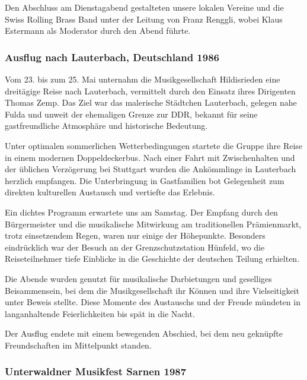 \begin{history}

    Den Abschluss am Dienstagabend gestalteten unsere lokalen Vereine und die
    Swiss Rolling Brass Band unter der Leitung von Franz Renggli, wobei Klaus
    Estermann als Moderator durch den Abend führte.

    \subsubsection*{Ausflug nach Lauterbach, Deutschland 1986}

    Vom 23. bis zum 25. Mai unternahm die Musikgesellschaft Hildisrieden eine
    dreitägige Reise nach Lauterbach, vermittelt durch den Einsatz ihres
    Dirigenten Thomas Zemp. Das Ziel war das malerische Städtchen Lauterbach,
    gelegen nahe Fulda und unweit der ehemaligen Grenze zur DDR, bekannt für
    seine gastfreundliche Atmosphäre und historische Bedeutung.

    Unter optimalen sommerlichen Wetterbedingungen startete die Gruppe ihre
    Reise in einem modernen Doppeldeckerbus. Nach einer Fahrt mit Zwischenhalten
    und der üblichen Verzögerung bei Stuttgart wurden die Ankömmlinge in
    Lauterbach herzlich empfangen. Die Unterbringung in Gastfamilien bot
    Gelegenheit zum direkten kulturellen Austausch und vertiefte das Erlebnis.

    Ein dichtes Programm erwartete uns am Samstag. Der Empfang durch den
    Bürgermeister und die musikalische Mitwirkung am traditionellen
    Prämienmarkt, trotz einsetzendem Regen, waren nur einige der Höhepunkte.
    Besonders eindrücklich war der Besuch an der Grenzschutzstation Hünfeld, wo
    die Reiseteilnehmer tiefe Einblicke in die Geschichte der deutschen Teilung
    erhielten.

    Die Abende wurden genutzt für musikalische Darbietungen und geselliges
    Beisammensein, bei dem die Musikgesellschaft ihr Können und ihre
    Vielseitigkeit unter Beweis stellte. Diese Momente des Austauschs und der
    Freude mündeten in langanhaltende Feierlichkeiten bis spät in die Nacht.

    Der Ausflug endete mit einem bewegenden Abschied, bei dem neu geknüpfte
    Freundschaften im Mittelpunkt standen.

    \subsubsection*{Unterwaldner Musikfest Sarnen 1987}


\end{history}
